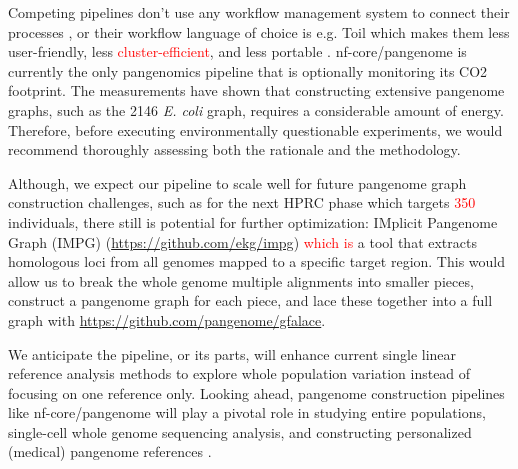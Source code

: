 \documentclass{bioinfo}
\theoremstyle{definition}
\newcommand{\red}[1]{{\textcolor{Red}{#1}}}
\begin{document}
	Competing pipelines don’t use any workflow management system to connect their processes \citep{Chin2023}, or their workflow language of choice is e.g. Toil \citep{Vivian2017, Hickey2023} which makes them less user-friendly, less \red{cluster-efficient}, and less portable \citep{Wratten2021}.
	nf-core/pangenome is currently the only pangenomics pipeline that is optionally monitoring its CO2 footprint. 
	The measurements have shown that constructing extensive pangenome graphs, such as the 2146 \textit{E. coli} graph, requires a considerable amount of energy. 
	Therefore, before executing environmentally questionable experiments, we would recommend thoroughly assessing both the rationale and the methodology. 
	
	Although, we expect our pipeline to scale well for future pangenome graph construction challenges, such as for the next HPRC phase which targets \red{350} individuals, there still is potential for further optimization: 
	IMplicit Pangenome Graph (IMPG) (\href{https://github.com/ekg/impg}{https://github.com/ekg/impg}) \red{which is} a tool that extracts homologous loci from all genomes mapped to a specific target region. 
	This would allow us to break the whole genome multiple alignments into smaller pieces, construct a pangenome graph for each piece, and lace these together into a full graph with \href{https://github.com/pangenome/gfalace}{https://github.com/pangenome/gfalace}. 
	
	We anticipate the pipeline, or its parts, will enhance current single linear reference analysis methods to explore whole population variation instead of focusing on one reference only. Looking ahead, pangenome construction pipelines like nf-core/pangenome will play a pivotal role in studying entire populations, single-cell whole genome sequencing analysis, and constructing personalized (medical) pangenome references \citep{Sirn2023}.
	\vspace{-0.6cm}
\end{document}
